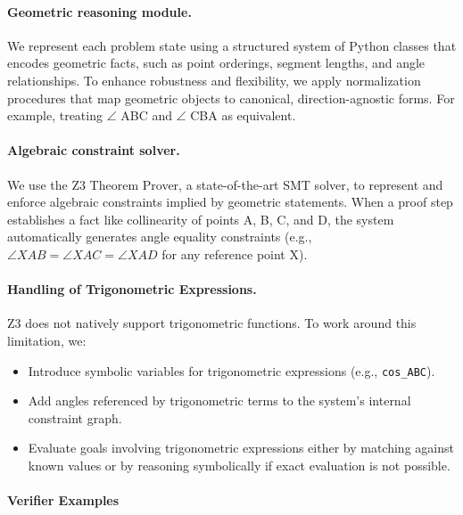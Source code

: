 
\paragraph{Geometric reasoning module.}
We represent each problem state using a structured system of Python classes that encodes geometric facts, such as point orderings, segment lengths, and angle relationships. To enhance robustness and flexibility, we apply normalization procedures that map geometric objects to canonical, direction-agnostic forms. For example, treating  $\angle$ ABC and  $\angle$ CBA as equivalent.



\paragraph{Algebraic constraint solver.}
We use the Z3 Theorem Prover, a state-of-the-art SMT solver, to represent and enforce algebraic constraints implied by geometric statements. When a proof step establishes a fact like collinearity of points A, B, C, and D, the system automatically generates angle equality constraints (e.g., $\angle XAB = \angle XAC = \angle XAD$ for any reference point X).

\paragraph{Handling of Trigonometric Expressions.}
Z3 does not natively support trigonometric functions. To work around this limitation, we:
\begin{itemize}
  \item Introduce symbolic variables for trigonometric expressions (e.g., \texttt{cos\_ABC}).
  \item Add angles referenced by trigonometric terms to the system’s internal constraint graph.
  \item Evaluate goals involving trigonometric expressions either by matching against known values or by reasoning symbolically if exact evaluation is not possible.
\end{itemize}



\paragraph{Verifier Examples}


